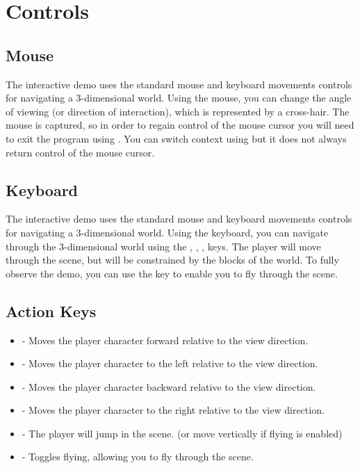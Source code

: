 \documentclass{book}
\begin{document}
\section{Controls}
\subsection{Mouse}
The interactive demo uses the standard mouse and keyboard movements controls for navigating a 3-dimensional world.  Using the mouse, you can change the angle of viewing (or direction of interaction), which is represented by a cross-hair.  The mouse is captured, so in order to regain control of the mouse cursor you will need to exit the program using .  You can switch context using  but it does not always return control of the mouse cursor.

\subsection{Keyboard}
The interactive demo uses the standard mouse and keyboard movements controls for navigating a 3-dimensional world.   Using the keyboard, you can navigate through the 3-dimensional world using the , , ,  keys.  The player will move through the scene, but will be constrained by the blocks of the world.  To fully observe the demo, you can use the  key to enable you to fly through the scene.

\subsection{Action Keys}
\begin{itemize}
	\item {} - Moves the player character forward relative to the view direction.
	\item {} - Moves the player character to the left relative to the view direction.
	\item {} - Moves the player character backward relative to the view direction.
	\item {} - Moves the player character to the right relative to the view direction.
	\item {} - The player will jump in the scene. (or move vertically if flying is enabled)
	\item {} - Toggles flying, allowing you to fly through the scene.
\end{itemize}
      
\end{document}
